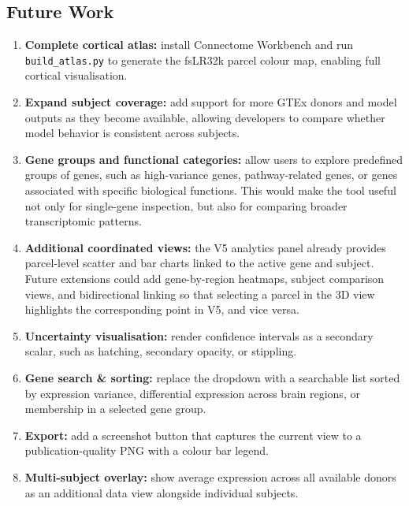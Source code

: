 \documentclass[11pt,letterpaper]{article}
\begin{document}
\subsection{Future Work}

\begin{enumerate}[nosep]
  \item \textbf{Complete cortical atlas:} install Connectome Workbench
        and run \texttt{build\_atlas.py} to generate the fsLR32k parcel
        colour map, enabling full cortical visualisation.

  \item \textbf{Expand subject coverage:} add support for more GTEx donors
        and model outputs as they become available, allowing developers to
        compare whether model behavior is consistent across subjects.

  \item \textbf{Gene groups and functional categories:} allow users to explore
        predefined groups of genes, such as high-variance genes, pathway-related
        genes, or genes associated with specific biological functions. This would
        make the tool useful not only for single-gene inspection, but also for
        comparing broader transcriptomic patterns.

  \item \textbf{Additional coordinated views:} the V5 analytics panel already
        provides parcel-level scatter and bar charts linked to the active gene
        and subject.
        Future extensions could add gene-by-region heatmaps, subject comparison
        views, and bidirectional linking so that selecting a parcel in the 3D
        view highlights the corresponding point in V5, and vice versa.

  \item \textbf{Uncertainty visualisation:} render confidence intervals
        as a secondary scalar, such as hatching, secondary opacity, or
        stippling.

  \item \textbf{Gene search \& sorting:} replace the dropdown with a
        searchable list sorted by expression variance, differential expression
        across brain regions, or membership in a selected gene group.

  \item \textbf{Export:} add a screenshot button that captures the
        current view to a publication-quality PNG with a colour bar legend.

  \item \textbf{Multi-subject overlay:} show average expression across
        all available donors as an additional data view alongside individual
        subjects.
\end{enumerate}
\end{document}
